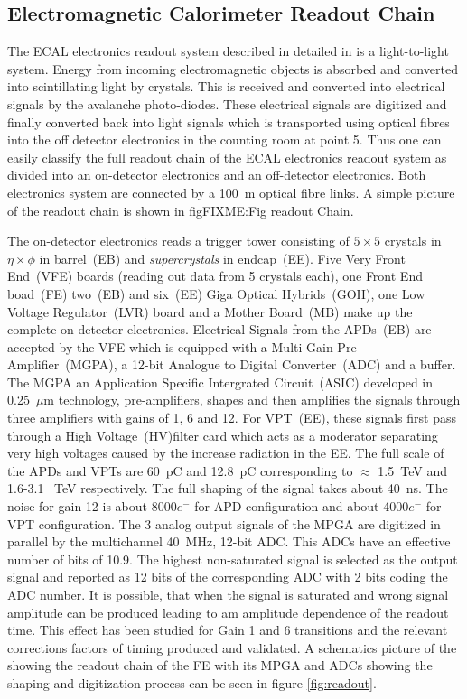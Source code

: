 \subsection{Electromagnetic Calorimeter Readout Chain}
The ECAL electronics readout system described in detailed in \cite{ECALREADOUT} is a light-to-light system. Energy from incoming electromagnetic objects is absorbed and converted into scintillating light by \pb crystals. This is received and converted into electrical signals by the avalanche photo-diodes. These electrical signals are digitized and finally converted back into light signals which is transported using optical fibres into the off detector electronics in the counting room at point 5. Thus one can easily classify the full readout chain of the ECAL electronics readout system as divided into an on-detector electronics and an off-detector electronics.
Both electronics system are connected by a 100~m optical fibre links. A simple picture of the readout chain is shown in fig{FIXME:Fig readout Chain}.

The on-detector electronics reads a trigger tower consisting of $5\times5$ crystals in $\eta \times \phi$ in barrel~(EB) and \textit{supercrystals} in endcap~(EE). Five Very Front End~(VFE) boards (reading out data from 5 crystals each), one Front End boad~(FE) two~(EB) and six~(EE) Giga Optical Hybrids~(GOH), one Low Voltage Regulator~(LVR) board and a Mother Board~(MB) make up the complete on-detector electronics. Electrical Signals from the APDs~(EB) are accepted by the VFE which is equipped with a Multi Gain Pre-Amplifier~(MGPA), a 12-bit Analogue to Digital Converter~(ADC) and a buffer. The MGPA an Application Specific Intergrated Circuit~(ASIC) developed in 0.25~$\mu$m technology, pre-amplifiers, shapes and then amplifies the signals through three amplifiers with gains of 1, 6 and 12. For VPT~(EE), these signals first pass through a High Voltage~(HV)filter card which acts as a moderator separating very high voltages caused by the increase radiation in the EE. The full scale of the APDs and VPTs are 60~pC and 12.8~pC corresponding to $\approx$ 1.5~TeV and 1.6-3.1~ TeV respectively. The full shaping of the signal takes about 40~ns. The noise for gain 12 is about 8000$e^{-}$ for APD configuration and about 4000$e^{-}$ for VPT configuration. 
The 3 analog output signals of the MPGA are digitized in parallel by the multichannel 40~MHz, 12-bit ADC. This ADCs have an effective number of bits of 10.9. The highest non-saturated signal is selected as the output signal and reported as 12 bits of the corresponding ADC with 2 bits coding the ADC number. It is possible, that when the signal is saturated and wrong signal amplitude can be produced leading to am amplitude dependence of the readout time. This effect has been studied for Gain 1 and 6 transitions and the relevant corrections factors of timing produced and validated.
A schematics picture of the showing the readout chain of the FE with its MPGA and ADCs showing the shaping and digitization process can be seen in figure \ref{fig:readout}.

